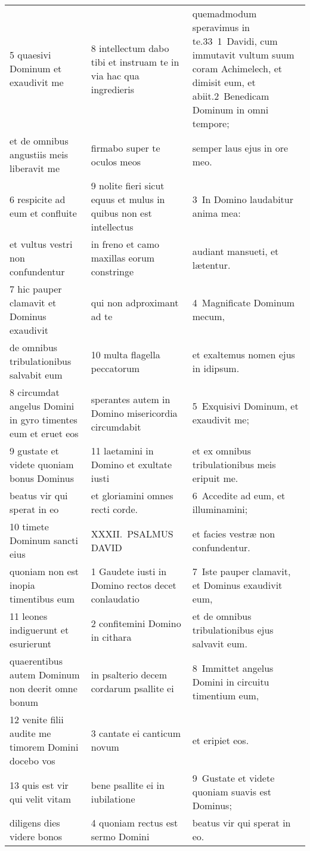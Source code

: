 \documentclass{article}
\begin{document}
\begin{longtable}{@{}p{}p{}p{}@{}}
5 quaesivi Dominum et exaudivit me	&	8 intellectum dabo tibi et instruam te in via hac qua ingredieris	&	quemadmodum speravimus in te.33 1 Davidi, cum immutavit vultum suum coram Achimelech, et dimisit eum, et abiit.2 Benedicam Dominum in omni tempore;	\\
et de omnibus angustiis meis liberavit me	&	firmabo super te oculos meos	&	semper laus ejus in ore meo.	\\
6 respicite ad eum et confluite	&	9 nolite fieri sicut equus et mulus in quibus non est intellectus	&	3 In Domino laudabitur anima mea:	\\
et vultus vestri non confundentur	&	in freno et camo maxillas eorum constringe	&	audiant mansueti, et lætentur.	\\
7 hic pauper clamavit et Dominus exaudivit	&	qui non adproximant ad te	&	4 Magnificate Dominum mecum,	\\
de omnibus tribulationibus salvabit eum	&	10 multa flagella peccatorum	&	et exaltemus nomen ejus in idipsum.	\\
8 circumdat angelus Domini in gyro timentes eum et eruet eos	&	sperantes autem in Domino misericordia circumdabit	&	5 Exquisivi Dominum, et exaudivit me;	\\
9 gustate et videte quoniam bonus Dominus	&	11 laetamini in Domino et exultate iusti	&	et ex omnibus tribulationibus meis eripuit me.	\\
beatus vir qui sperat in eo	&	et gloriamini omnes recti corde.	&	6 Accedite ad eum, et illuminamini;	\\
10 timete Dominum sancti eius	&	XXXII. PSALMUS DAVID	&	et facies vestræ non confundentur.	\\
quoniam non est inopia timentibus eum	&	1 Gaudete iusti in Domino rectos decet conlaudatio	&	7 Iste pauper clamavit, et Dominus exaudivit eum,	\\
11 leones indiguerunt et esurierunt	&	2 confitemini Domino in cithara	&	et de omnibus tribulationibus ejus salvavit eum.	\\
quaerentibus autem Dominum non deerit omne bonum	&	in psalterio decem cordarum psallite ei	&	8 Immittet angelus Domini in circuitu timentium eum,	\\
12 venite filii audite me timorem Domini docebo vos	&	3 cantate ei canticum novum	&	et eripiet eos.	\\
13 quis est vir qui velit vitam	&	bene psallite ei in iubilatione	&	9 Gustate et videte quoniam suavis est Dominus;	\\
diligens dies videre bonos	&	4 quoniam rectus est sermo Domini	&	beatus vir qui sperat in eo.	\\

\end{longtable}
\end{document}
